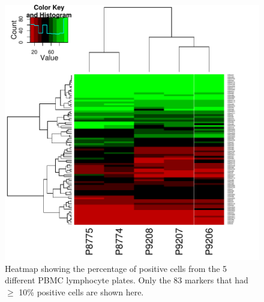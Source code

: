 \documentclass[12pt]{article}
\begin{document}
\begin{figure}
\centering
\includegraphics{outline-pbmcHeat}
\caption{Heatmap showing the percentage of positive cells from the 5 different PBMC lymphocyte plates. Only the 83 markers
that had $\ge$ 10\% positive cells are shown here.}
\label{fig:pbmcHeat}
\end{figure}
\end{document}
